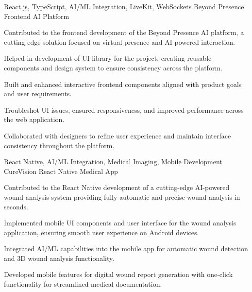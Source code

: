 \begin{cventries}
  \cventry
    {React.js, TypeScript, AI/ML Integration, LiveKit, WebSockets} %
    {Beyond Presence} %
    {Frontend AI Platform} %
    {}
    {
      \begin{cvitems} %
        \item {Contributed to the frontend development of the Beyond Presence AI platform, a cutting-edge solution focused on virtual presence and AI-powered interaction.}
        \item {Helped in development of UI library for the project, creating reusable components and design system to ensure consistency across the platform.}
        \item {Built and enhanced interactive frontend components aligned with product goals and user requirements.}
        \item {Troubleshot UI issues, ensured responsiveness, and improved performance across the web application.}
        \item {Collaborated with designers to refine user experience and maintain interface consistency throughout the platform.}
      \end{cvitems}
    }


  \cventry
    {React Native, AI/ML Integration, Medical Imaging, Mobile Development} %
    {CureVision} %
    {React Native Medical App} %
    {} %
    {
      \begin{cvitems} %
        \item {Contributed to the React Native development of a cutting-edge AI-powered wound analysis system providing fully automatic and precise wound analysis in seconds.}
        \item {Implemented mobile UI components and user interface for the wound analysis application, ensuring smooth user experience on Android devices.}
        \item {Integrated AI/ML capabilities into the mobile app for automatic wound detection and 3D wound analysis functionality.}
        \item {Developed mobile features for digital wound report generation with one-click functionality for streamlined medical documentation.}
      \end{cvitems}
    }

\end{cventries} 